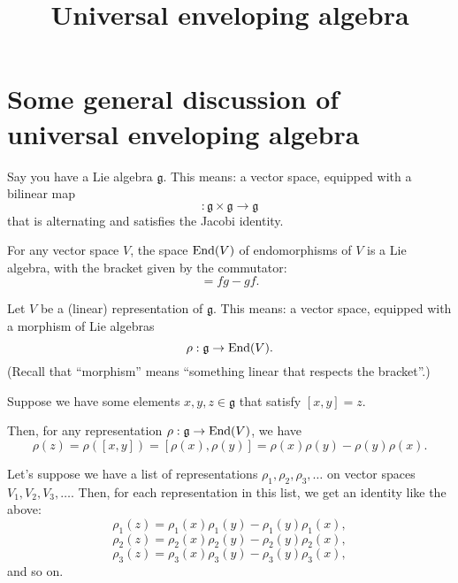 \documentclass[reqno]{amsart} 
\title{Universal enveloping algebra}
\begin{document}
\maketitle

\section{Some general discussion of universal enveloping algebra}\label{sec:cngsxurern}
Say you have a Lie algebra $\mathfrak{g}$.  This means: a vector space, equipped with a bilinear map
\begin{equation*}
  [\cdot, \cdot] : \mathfrak{g} \times \mathfrak{g} \rightarrow \mathfrak{g}
\end{equation*}
that is alternating and satisfies the Jacobi identity.

\begin{example}\label{example:cngsxuq83x}
  For any vector space $V$, the space $\operatorname{End}(V)$ of endomorphisms of $V$ is a Lie algebra, with the bracket given by the commutator:
  \begin{equation*}
    [f, g] = f g - g f.
  \end{equation*}
\end{example}

Let $V$ be a (linear) representation of $\mathfrak{g}$.  This means: a vector space, equipped with a morphism of Lie algebras
\begin{equation*}
  \rho : \mathfrak{g} \rightarrow \operatorname{End}(V).
\end{equation*}
(Recall that ``morphism'' means ``something linear that respects the bracket''.)

Suppose we have some elements $x, y, z \in \mathfrak{g}$ that satisfy $[x,y] = z$.

Then, for any representation $\rho : \mathfrak{g} \rightarrow \operatorname{End}(V)$, we have
\begin{equation*}
  \rho(z) = \rho([x,y]) = [\rho(x), \rho(y)] = \rho(x) \rho(y) - \rho(y) \rho(x).
\end{equation*}

Let's suppose we have a list of representations $\rho_1, \rho_2, \rho_3, \dotsc$ on vector spaces $V_1, V_2, V_3, \dotsc$.  Then, for each representation in this list, we get an identity like the above:
\begin{equation*}
  \rho_1(z) = \rho_1(x) \rho_1(y) - \rho_1(y) \rho_1(x),
\end{equation*}
\begin{equation*}
  \rho_2(z) = \rho_2(x) \rho_2(y) - \rho_2(y) \rho_2(x),
\end{equation*}
\begin{equation*}
  \rho_3(z) = \rho_3(x) \rho_3(y) - \rho_3(y) \rho_3(x),
\end{equation*}
and so on.
\end{document}
